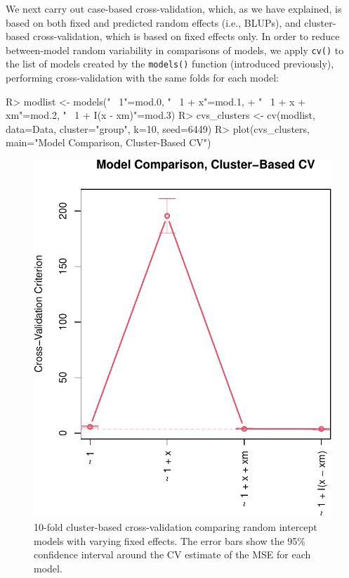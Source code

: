 \documentclass[
]{jss}
\begin{document}
We next carry out case-based cross-validation, which, as we have
explained, is based on both fixed and predicted random effects (i.e.,
BLUPs), and cluster-based cross-validation, which is based on fixed
effects only. In order to reduce between-model random variability in
comparisons of models, we apply \texttt{cv()} to the list of models
created by the \texttt{models()} function (introduced previously),
performing cross-validation with the same folds for each model:

\begin{CodeChunk}
\begin{CodeInput}
R> modlist <- models("~ 1"=mod.0, "~ 1 + x"=mod.1, 
+                   "~ 1 + x + xm"=mod.2, "~ 1 + I(x - xm)"=mod.3)
R> cvs_clusters <- cv(modlist, data=Data, cluster="group", k=10, seed=6449)
R> plot(cvs_clusters, main="Model Comparison, Cluster-Based CV")
\end{CodeInput}
\begin{figure}

{\centering \includegraphics[width=1\linewidth]{JSS-article_files/figure-latex/cross-validation-clusters-1} 

}

\caption[10-fold cluster-based cross-validation comparing random intercept models with varying fixed effects]{10-fold cluster-based cross-validation comparing random intercept models with varying fixed effects. The error bars show the 95\% confidence interval around the CV estimate of the MSE for each model.}\label{fig:cross-validation-clusters}
\end{figure}
\end{CodeChunk}
\end{document}
